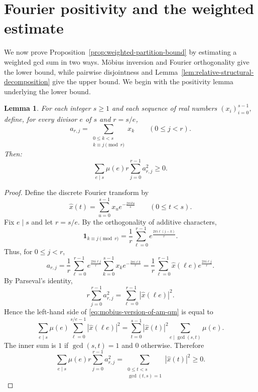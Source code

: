 \documentclass[11pt]{amsart}
\newtheorem{lem}[thm]{Lemma}
\theoremstyle{remark}
\begin{document}
\section{Fourier positivity and the weighted estimate}
\label{sec:weighted-estimate}
We now prove Proposition~\ref{prop:weighted-partition-bound} by estimating a
weighted gcd sum in two ways. M\"obius inversion and Fourier orthogonality give
the lower bound, while pairwise disjointness and
Lemma~\ref{lem:relative-structural-decomposition} give the upper bound. We
begin with the positivity lemma underlying the lower bound.
\begin{lem} \label{lem:mobius-version-of-am-qm}
  For each integer $s \geq 1$ and each sequence of real numbers $(x_i)_{i = 0}^{s-1}$, define, for every divisor $e$ of $s$ and $r = s/e$,
  \[
    a_{r,j}=\sum_{\substack{0\le k<s\\ k\equiv j \pmod r}}x_k\qquad (0\le j<r).
  \]
  Then:
  \begin{equation} \label{eq:mobius-version-of-am-qm}
    \sum_{e\mid s}\mu(e)r\sum_{j=0}^{r-1} a_{r,j}^2\ge 0.
  \end{equation}
\end{lem}

\begin{proof}
  Define the discrete Fourier transform by
  \[
    \widehat x(t)=\sum_{u=0}^{s-1}x_u e^{-\frac{2\pi i t u}{s}}\qquad (0\le t<s).
  \]
  Fix $e\mid s$ and let $r=s/e$. By the orthogonality of additive characters,
  \[
    \mathbf 1_{k\equiv j \pmod r}
    =\frac1r\sum_{\ell=0}^{r-1}e^{\frac{2\pi i\ell(j-k)}{r}}.
  \]
  Thus, for $0\le j<r$,
  \[
    a_{r,j}
    =\frac1r\sum_{\ell=0}^{r-1}e^{\frac{2\pi i\ell j}{r}}
    \sum_{k=0}^{s-1}x_k e^{-\frac{2\pi i\ell k}{r}}
    =\frac1r\sum_{\ell=0}^{r-1}\widehat x(\ell e)e^{\frac{2\pi i\ell j}{r}}.
  \]
  By Parseval's identity,
  \[
    r\sum_{j=0}^{r-1}a_{r,j}^2
    = \sum_{\ell=0}^{r-1}|\widehat x(\ell e)|^2.
  \]
  Hence the left-hand side of \eqref{eq:mobius-version-of-am-qm} is equal to
  \[
    \sum_{e\mid s}\mu(e)\sum_{\ell=0}^{s/e-1}|\widehat x(\ell e)|^2
    = \sum_{t=0}^{s-1}|\widehat x(t)|^2\sum_{e\mid \gcd(s,t)}\mu(e).
  \]
  The inner sum is $1$ if $\gcd(s,t)=1$ and $0$ otherwise. Therefore
  \[
    \sum_{e\mid s}\mu(e)r\sum_{j=0}^{r-1} a_{r,j}^2
    =\sum_{\substack{0\le t<s\\ \gcd(t,s)=1}}|\widehat x(t)|^2\ge 0.
  \]
\end{proof}
\end{document}
